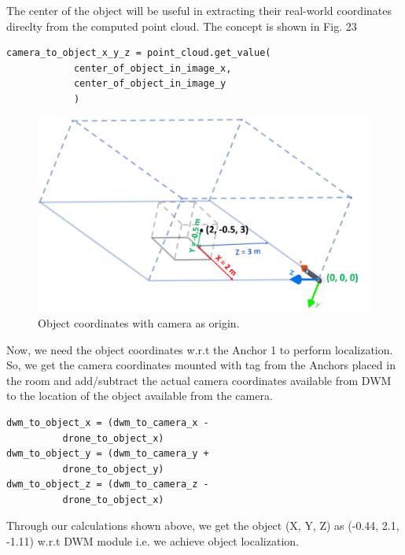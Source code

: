 \documentclass{IEEEtran}
\begin{document}
The center of the object will be useful in extracting their real-world coordinates direclty from the computed point cloud. The concept is shown in Fig. 23

\begin{lstlisting}
camera_to_object_x_y_z = point_cloud.get_value(
			center_of_object_in_image_x, 
			center_of_object_in_image_y
			)
\end{lstlisting}

\begin{figure}[htb]
\centering
\includegraphics[width=0.85\linewidth]{fig/camera_to_obj_world.png}
\caption{Object coordinates with camera as origin.} \label{fig.structure}
\end{figure}
Now, we need the object coordinates w.r.t the Anchor 1 to perform localization. So, we get the camera coordinates mounted with tag from the Anchors placed in the room and add/subtract the actual camera coordinates available from DWM to the location of the object available from the camera.

\begin{lstlisting}
dwm_to_object_x = (dwm_to_camera_x - 
		  drone_to_object_x)
dwm_to_object_y = (dwm_to_camera_y + 
		  drone_to_object_y) 
dwm_to_object_z = (dwm_to_camera_z - 
		  drone_to_object_x)
\end{lstlisting}

Through our calculations shown above, we get the object (X, Y, Z) as (-0.44, 2.1, -1.11) w.r.t DWM module i.e. we achieve object localization.
\end{document}
